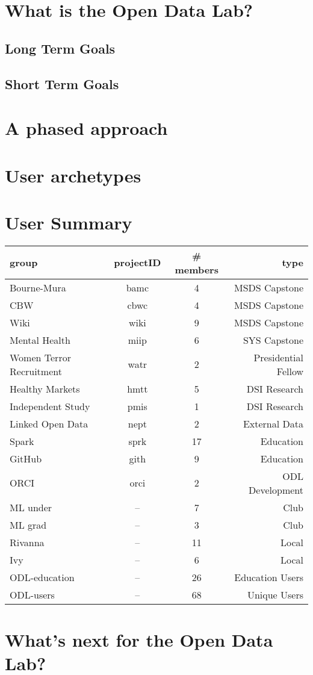 \section{What is the Open Data Lab?}
\subsection{Long Term Goals}
\subsection{Short Term Goals}
\section{A phased approach}
\section{User archetypes}
\section{User Summary}
\begin{tabular}{lccr}
\hline
\hline
group & projectID & \# members & type \\
\hline
\hline
Bourne-Mura & bamc & 4 & MSDS Capstone \\
CBW & cbwc & 4 & MSDS Capstone\\
Wiki & wiki & 9 & MSDS Capstone\\
Mental Health & miip & 6 & SYS Capstone\\
\hline
Women Terror Recruitment & watr & 2 & Presidential Fellow\\
\hline
Healthy Markets & hmtt & 5 & DSI Research\\
Independent Study & pmis & 1 & DSI Research\\
\hline
Linked Open Data   & nept & 2 & External Data\\
\hline
Spark & sprk & 17 & Education \\
GitHub & gith & 9 & Education \\
\hline
ORCI & orci & 2 & ODL Development\\
\hline
ML under & -- & 7 & Club\\
ML grad & -- & 3 & Club\\
Rivanna & -- & 11 & Local\\
Ivy & -- & 6 & Local\\
\hline
\hline
ODL-education  & -- & 26 & Education Users\\
ODL-users & -- & 68 & Unique Users\\
\hline
\hline
\end{tabular}

\section{What's next for the Open Data Lab?}

